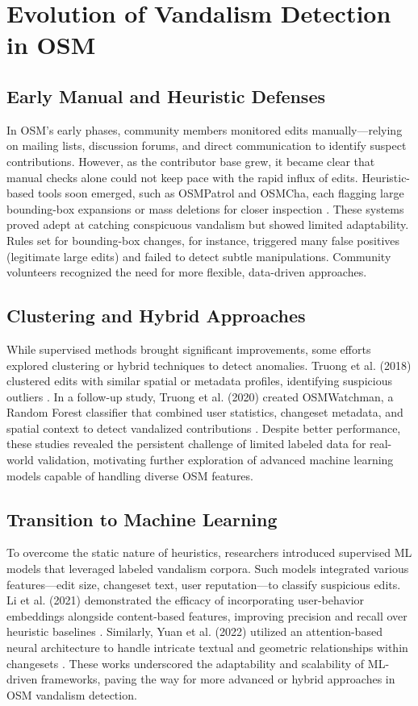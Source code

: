 \documentclass[
    13pt, %
    a4paper, %
    twoside, 
    DIV14, %
    listof=totoc, %
    bibliography=totoc, %
    index=totoc, %
    headsepline
]{scrreprt}
\begin{document}
\section{Evolution of Vandalism Detection in OSM}
\label{sec:evolution_osm_vandalism}

\subsection{Early Manual and Heuristic Defenses}
In OSM’s early phases, community members monitored edits manually—relying on mailing lists, discussion forums, and direct communication to identify suspect contributions. However, as the contributor base grew, it became clear that manual checks alone could not keep pace with the rapid influx of edits. Heuristic-based tools soon emerged, such as OSMPatrol and OSMCha, each flagging large bounding-box expansions or mass deletions for closer inspection \cite{OSMPatrol, OSMCha, Neis2012}. These systems proved adept at catching conspicuous vandalism but showed limited adaptability. Rules set for bounding-box changes, for instance, triggered many false positives (legitimate large edits) and failed to detect subtle manipulations. Community volunteers recognized the need for more flexible, data-driven approaches.

\subsection{Clustering and Hybrid Approaches}
While supervised methods brought significant improvements, some efforts explored clustering or hybrid techniques to detect anomalies. Truong et al. (2018) clustered edits with similar spatial or metadata profiles, identifying suspicious outliers \cite{Truong2018}. In a follow-up study, Truong et al. (2020) created OSMWatchman, a Random Forest classifier that combined user statistics, changeset metadata, and spatial context to detect vandalized contributions \cite{Truong2020}. Despite better performance, these studies revealed the persistent challenge of limited labeled data for real-world validation, motivating further exploration of advanced machine learning models capable of handling diverse OSM features.

\subsection{Transition to Machine Learning}

To overcome the static nature of heuristics, researchers introduced supervised ML models that leveraged labeled vandalism corpora. Such models integrated various features—edit size, changeset text, user reputation—to classify suspicious edits. Li et al. (2021) demonstrated the efficacy of incorporating user-behavior embeddings alongside content-based features, improving precision and recall over heuristic baselines \cite{Li2021}. Similarly, Yuan et al. (2022) utilized an attention-based neural architecture to handle intricate textual and geometric relationships within changesets \cite{Yuan2022}. These works underscored the adaptability and scalability of ML-driven frameworks, paving the way for more advanced or hybrid approaches in OSM vandalism detection.
\end{document}

